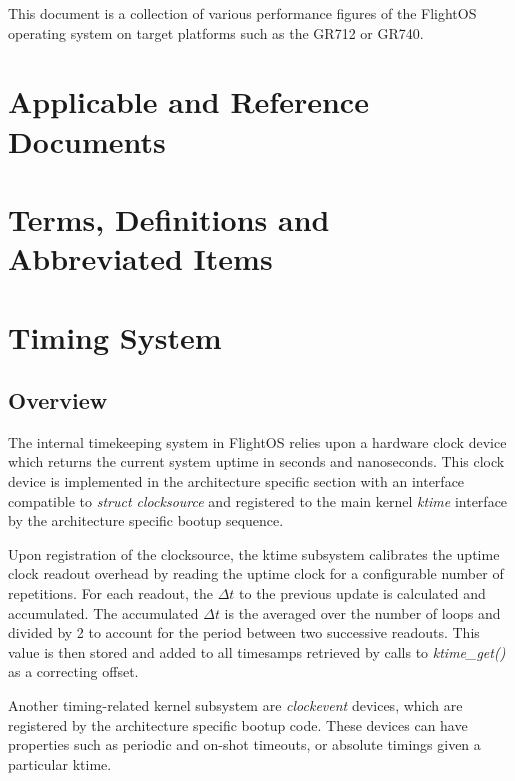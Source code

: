 This document is a collection of various performance figures of the FlightOS
operating system on target platforms such as the GR712 or GR740.

\chapter{Applicable and Reference Documents} %

\printbibliography[heading=none]


\chapter{Terms, Definitions and Abbreviated Items}


\chapter{Timing System}\label{chap:timing}

\section{Overview}

The internal timekeeping system in FlightOS relies upon a hardware
clock device which returns the current system uptime in seconds and nanoseconds.
This clock device is implemented in the architecture specific section with
an interface compatible to \emph{struct clocksource} and registered to
the main kernel \emph{ktime} interface by the architecture specific
bootup sequence.

Upon registration of the clocksource, the ktime subsystem calibrates the
uptime clock readout overhead by reading the uptime clock for a configurable
number of repetitions. For each readout, the $\Delta t$ to the previous
update is calculated and accumulated. The accumulated $\Delta t$ is the
averaged over the number of loops and divided by 2 to account for the
period between two successive readouts. This value is then stored and
added to all timesamps retrieved by calls to \emph{ktime\_get()} as a
correcting offset.

Another timing-related kernel subsystem are \emph{clockevent} devices,
which are registered by the architecture specific bootup code. These devices
can have properties such as periodic and on-shot timeouts, or absolute timings
given a particular ktime.

